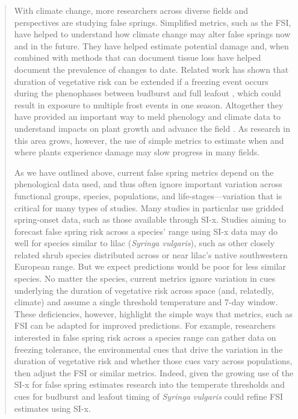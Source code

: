 \documentclass[11pt,a4paper]{article}
\begin{document}
\begin{quotation}
With climate change, more researchers across diverse fields and perspectives are studying false springs. Simplified metrics, such as the FSI, have helped to understand how climate change may alter false springs now and in the future. They have helped estimate potential damage and, when combined with methods that can document tissue loss \citep[e.g., PhenoCam images can capture initial greenup, defoliation due to frost or herbivory, then refoliation,][]{Richardson2018b} have helped document the prevalence of changes to date. Related work has shown that duration of vegetative risk can be extended if a freezing event occurs during the phenophases between budburst and full leafout \citep{Augspurger2009}, which could result in exposure to multiple frost events in one season. Altogether they have provided an important way to meld phenology and climate data to understand impacts on plant growth and advance the field \citep{Allstadt2015, Ault2015, Liu2018, Peterson2014}. As research in this area grows, however, the use of simple metrics to estimate when and where plants experience damage may slow progress in many fields. 

As we have outlined above, current false spring metrics depend on the phenological data used, and thus often ignore important variation across functional groups, species, populations, and life-stages---variation that is critical for many types of studies. Many studies in particular use gridded spring-onset data, such as those available through SI-x. Studies aiming to forecast false spring risk across a species' range using SI-x data may do well for species similar to lilac (\emph{Syringa vulgaris}), such as other closely related shrub species distributed across or near lilac's native southwestern European range. But we expect predictions would be poor for less similar species. No matter the species, current metrics ignore variation in cues underlying the duration of vegetative risk across space (and, relatedly, climate) and assume a single threshold temperature and 7-day window. These deficiencies, however, highlight the simple ways that metrics, such as FSI can be adapted for improved predictions. For example, researchers interested in false spring risk across a species range can gather data on freezing tolerance, the environmental cues that drive the variation in the duration of vegetative risk and whether those cues vary across populations, then adjust the FSI or similar metrics. Indeed, given the growing use of the SI-x for false spring estimates research into the temperate thresholds and cues for budburst and leafout timing of \emph{Syringa vulgaris} could refine FSI estimates using SI-x. 


\end{quotation}
\end{document}
